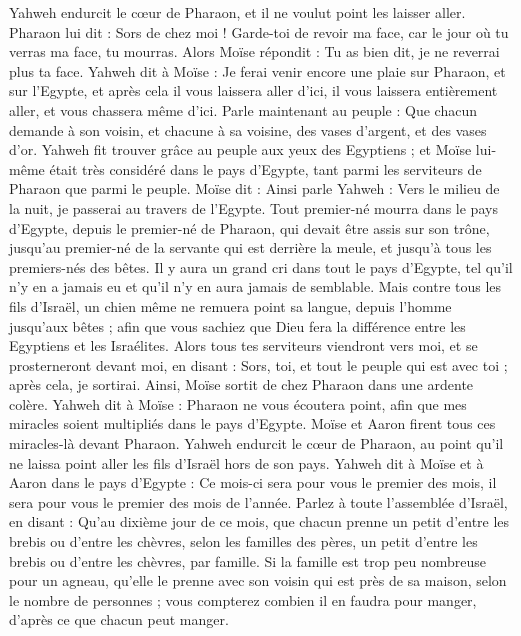 \begin{multicols}{2}
Yahweh endurcit le cœur de Pharaon, et il ne voulut point les laisser aller.
Pharaon lui dit : Sors de chez moi ! Garde-toi de revoir ma face, car le jour où tu verras ma face, tu mourras.
Alors Moïse répondit : Tu as bien dit, je ne reverrai plus ta face.
\VerseOne{}Yahweh dit à Moïse : Je ferai venir encore une plaie sur Pharaon, et sur l'Egypte, et après cela il vous laissera aller d'ici, il vous laissera entièrement aller, et vous chassera même d’ici.
Parle maintenant au peuple : Que chacun demande à son voisin, et chacune à sa voisine, des vases d'argent, et des vases d'or.
Yahweh fit trouver grâce au peuple aux yeux des Egyptiens ; et Moïse lui-même était très considéré dans le pays d'Egypte, tant parmi les serviteurs de Pharaon que parmi le peuple.
Moïse dit : Ainsi parle Yahweh : Vers le milieu de la nuit, je passerai au travers de l'Egypte.
Tout premier-né mourra dans le pays d'Egypte, depuis le premier-né de Pharaon, qui devait être assis sur son trône, jusqu'au premier-né de la servante qui est derrière la meule, et jusqu’à tous les premiers-nés des bêtes.
Il y aura un grand cri dans tout le pays d'Egypte, tel qu'il n'y en a jamais eu et qu’il n'y en aura jamais de semblable.
Mais contre tous les fils d'Israël, un chien même ne remuera point sa langue, depuis l'homme jusqu’aux bêtes ; afin que vous sachiez que Dieu fera la différence entre les Egyptiens et les Israélites.
Alors tous tes serviteurs viendront vers moi, et se prosterneront devant moi, en disant : Sors, toi, et tout le peuple qui est avec toi ; après cela, je sortirai. Ainsi, Moïse sortit de chez Pharaon dans une ardente colère.
Yahweh dit à Moïse : Pharaon ne vous écoutera point, afin que mes miracles soient multipliés dans le pays d'Egypte.
Moïse et Aaron firent tous ces miracles-là devant Pharaon. Yahweh endurcit le cœur de Pharaon, au point qu'il ne laissa point aller les fils d'Israël hors de son pays.
\VerseOne{}Yahweh dit à Moïse et à Aaron dans le pays d'Egypte :
Ce mois-ci sera pour vous le premier des mois, il sera pour vous le premier des mois de l'année.
Parlez à toute l'assemblée d'Israël, en disant : Qu'au dixième jour de ce mois, que chacun prenne un petit d'entre les brebis ou d'entre les chèvres, selon les familles des pères, un petit d'entre les brebis ou d'entre les chèvres, par famille.
Si la famille est trop peu nombreuse pour un agneau, qu'elle le prenne avec son voisin qui est près de sa maison, selon le nombre de personnes ; vous compterez combien il en faudra pour manger, d’après ce que chacun peut manger.

\end{multicols}
